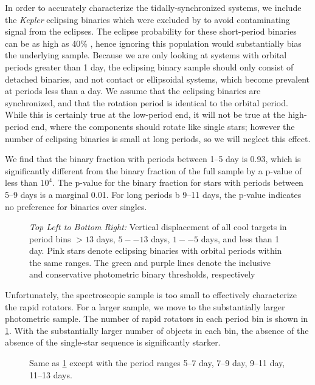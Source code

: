 \documentclass[manuscript]{aastex6}
\newcommand{\Kepler}{\mbox{\textit{Kepler}}}
\begin{document}
In order to accurately characterize the tidally-synchronized systems, we
include the \Kepler{} eclipsing binaries which were excluded by 
\citep{McQuillan14} to avoid contaminating signal from the eclipses. The 
eclipse probability for these short-period binaries can be as high as 40\% 
\citep{Kirk16}, hence ignoring this population would substantially
bias the underlying sample. Because we are only looking at systems with orbital
periods greater than 1 day, the eclipsing binary sample should only consist of
detached binaries, and not contact or ellipsoidal systems, which become
prevalent at periods less than a day. We assume that the eclipsing binaries are
synchronized, and that the rotation period is identical to the orbital period.
While this is certainly true at the low-period end, it will not be true at the
high-period end, where the components should rotate like single stars; 
however the number of eclipsing binaries is small at long periods, so we will
neglect this effect.

We find that the binary fraction with periods between 1--5 day is 0.93, which
is significantly different from the binary fraction of the full sample by a
p-value of less than \(10^4\). The p-value for the binary fraction for stars
with periods between 5--9 days is a marginal 0.01. For long periods b
9--11 days, the p-value indicates no preference for binaries over singles.

\begin{figure}[htb]
    \centering
    \caption{\emph{Top Left to Bottom Right:} Vertical displacement of all 
        cool \citet{McQuillan14} targets in period bins \(> 13\) days, 
        \(5--13\) days, \(1--5\) days, and less than 1 day. Pink stars denote 
        eclipsing binaries with orbital periods within the same ranges. The 
        green and purple lines denote the inclusive and conservative 
        photometric binary thresholds, 
    respectively}\label{fig:mcq_rapid_excess}
\end{figure}

Unfortunately, the spectroscopic sample is too small to effectively
characterize the rapid rotators. For a larger sample, we move to the 
substantially larger photometric sample. The number of rapid rotators in each 
period bin is shown in \cref{fig:mcq_rapid_excess}. With the substantially 
larger number of objects in each bin, the absence of the absence of the
single-star sequence is significantly starker.

\begin{figure}[htb]
    \centering
    \caption{Same as \cref{fig:mcq_rapid_excess} except with the period ranges
    5--7 day, 7--9 day, 9--11 day, 11--13 days.}
    \label{fig:mcquillan_transition}
\end{figure}
\end{document}

